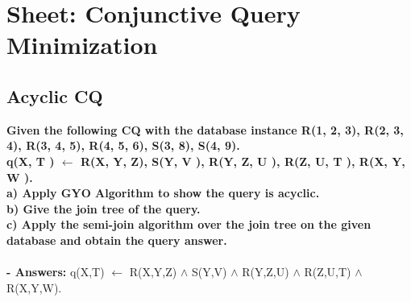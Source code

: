\documentclass{article}
\begin{document}
\section{Sheet: Conjunctive Query Minimization}
\subsection{Acyclic CQ}
\textbf{Given the following CQ with the database instance R(1, 2, 3), R(2, 3, 4), R(3, 4, 5), R(4, 5, 6), S(3, 8), S(4, 9).\\
q(X, T ) $\leftarrow$ R(X, Y, Z), S(Y, V ), R(Y, Z, U ), R(Z, U, T ), R(X, Y, W ).\\
a) Apply GYO Algorithm to show the query is acyclic.\\
b) Give the join tree of the query.\\
c) Apply the semi-join algorithm over the join tree on the given database and obtain the query answer.\\\\}
\textbf{- Answers:}
q(X,T) $\leftarrow$ R(X,Y,Z) $\wedge$ S(Y,V) $\wedge$ R(Y,Z,U) $\wedge$ R(Z,U,T) $\wedge$ R(X,Y,W).
\end{document}
